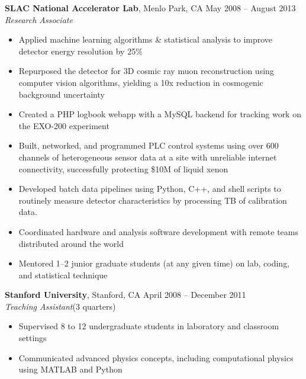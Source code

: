\documentclass[margin,line]{resume}
\begin{document}
\begin{resume}


    \textbf{SLAC National Accelerator Lab}, Menlo Park, CA \hfill May 2008 -- August 2013\vspace{1mm}\\\vspace{1mm}%
    \textsl{Research Associate}
    \begin{itemize}
    \item Applied machine learning algorithms \& statistical analysis to improve detector energy resolution by 25\%
    \item Repurposed the detector for 3D cosmic ray muon reconstruction using computer vision algorithms, yielding a 10x reduction in cosmogenic background uncertainty
    \item Created a PHP logbook webapp with a MySQL backend for tracking work on the EXO-200 experiment
    \item Built, networked, and programmed PLC control systems using over 600 channels of heterogeneous sensor data at a site with unreliable internet connectivity, successfully protecting \$10M of liquid xenon
    \item Developed batch data pipelines using Python, C++, and shell scripts to routinely measure detector characteristics by processing TB of calibration data.
    \item Coordinated hardware and analysis software development with remote teams distributed around the world 
    \item Mentored 1--2 junior graduate students (at any given time) on lab, coding, and statistical technique
    \end{itemize}

    \textbf{Stanford University}, Stanford, CA \hfill April 2008 -- December 2011 \vspace{0mm}\\
    \textsl{Teaching Assistant}\hfill (3 quarters)%
    \begin{itemize}
    \item Supervised 8 to 12 undergraduate students in laboratory and classroom settings
    \item Communicated advanced physics concepts, including computational physics using MATLAB and Python
    \end{itemize}


\end{resume}
\end{document}
